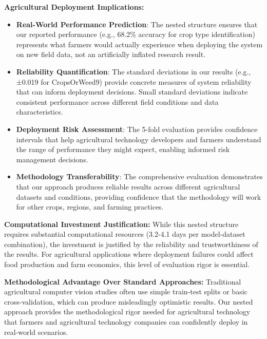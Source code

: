 \textbf{Agricultural Deployment Implications:}

\begin{itemize}
    \item \textbf{Real-World Performance Prediction}: The nested structure ensures that our reported performance (e.g., 68.2\% accuracy for crop type identification) represents what farmers would actually experience when deploying the system on new field data, not an artificially inflated research result.
    
    \item \textbf{Reliability Quantification}: The standard deviations in our results (e.g., ±0.019 for CropsOrWeed9) provide concrete measures of system reliability that can inform deployment decisions. Small standard deviations indicate consistent performance across different field conditions and data characteristics.
    
    \item \textbf{Deployment Risk Assessment}: The 5-fold evaluation provides confidence intervals that help agricultural technology developers and farmers understand the range of performance they might expect, enabling informed risk management decisions.
    
    \item \textbf{Methodology Transferability}: The comprehensive evaluation demonstrates that our approach produces reliable results across different agricultural datasets and conditions, providing confidence that the methodology will work for other crops, regions, and farming practices.
\end{itemize}

\textbf{Computational Investment Justification:} While this nested structure requires substantial computational resources (3.2-4.1 days per model-dataset combination), the investment is justified by the reliability and trustworthiness of the results. For agricultural applications where deployment failures could affect food production and farm economics, this level of evaluation rigor is essential.

\textbf{Methodological Advantage Over Standard Approaches:} Traditional agricultural computer vision studies often use simple train-test splits or basic cross-validation, which can produce misleadingly optimistic results. Our nested approach provides the methodological rigor needed for agricultural technology that farmers and agricultural technology companies can confidently deploy in real-world scenarios.

